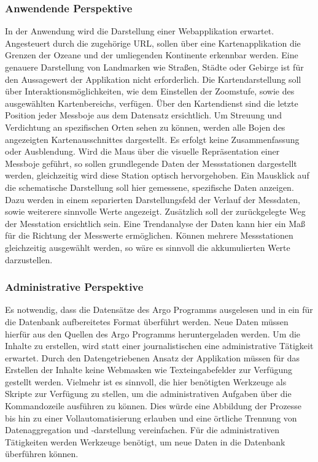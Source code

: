     \subsubsection{Anwendende Perspektive}\label{sec:funkAnforderungenAnwender}
    
    In der Anwendung wird die Darstellung einer Webapplikation erwartet. Angesteuert durch die zugehörige URL,  
    sollen über eine Kartenapplikation die Grenzen der Ozeane und der umliegenden Kontinente erkennbar werden.  Eine genauere Darstellung von Landmarken wie Straßen, Städte oder Gebirge ist für den Aussagewert der Applikation nicht erforderlich. Die Kartendarstellung soll über Interaktionsmöglichkeiten, wie dem Einstellen der Zoomstufe, sowie des ausgewählten Kartenbereichs, verfügen. Über den Kartendienst sind die letzte Position jeder Messboje aus dem Datensatz ersichtlich. Um Streuung und Verdichtung an spezifischen Orten sehen zu können, werden alle Bojen des angezeigten Kartenausschnittes dargestellt. Es erfolgt keine Zusammenfassung oder Ausblendung.
    Wird die Maus über die visuelle Repräsentation einer Messboje geführt, so sollen grundlegende Daten der Messstationen dargestellt werden, gleichzeitig wird diese Station optisch hervorgehoben.
    Ein Mausklick auf die schematische Darstellung soll hier gemessene, spezifische Daten anzeigen. Dazu werden in einem separierten Darstellungsfeld der Verlauf der Messdaten, sowie weiterere sinnvolle Werte angezeigt. Zusätzlich soll der zurückgelegte Weg der Messtation ersichtlich sein.  Eine Trendanalyse der Daten kann hier ein Maß für die Richtung der Messwerte ermöglichen. Können mehrere Messstationen gleichzeitig ausgewählt werden, so wäre es sinnvoll die akkumulierten Werte darzustellen.
    
    \subsubsection{Administrative Perspektive} \label{sec:funkAnforderungenAdmin}
    
    Es notwendig, dass die Datensätze des Argo Programms ausgelesen und in ein für die Datenbank aufbereitetes Format überführt werden. Neue Daten müssen hierfür aus den Quellen des Argo Programms heruntergeladen werden. Um die Inhalte zu erstellen, wird statt einer journalistischen eine administrative Tätigkeit erwartet. Durch den Datengetriebenen Ansatz der Applikation müssen für das Erstellen der Inhalte keine Webmasken wie Texteingabefelder zur Verfügung gestellt werden. Vielmehr ist es sinnvoll, die hier benötigten Werkzeuge als Skripte zur Verfügung zu stellen, um die administrativen Aufgaben über die Kommandozeile ausführen zu können. Dies würde eine Abbildung der Prozesse bis hin zu einer Vollautomatisierung erlauben und eine örtliche Trennung von Datenaggregation und -darstellung vereinfachen.
    Für die administrativen Tätigkeiten werden Werkzeuge benötigt, um neue Daten  in die Datenbank überführen können.  
    

